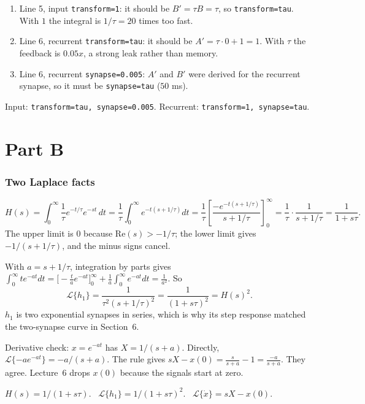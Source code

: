 \documentclass[11pt,letterpaper]{article}
\newcommand{\ans}[1]{\par\vspace{4pt}{\bfseries #1}\quad}
\begin{document}
\ans{Q2}
\begin{enumerate}[label=(\arabic*)]
\item Line 5, input \texttt{transform=1}: it should be $B' = \tau B = \tau$, so \texttt{transform=tau}. With $1$ the integral is $1/\tau = 20$ times too fast.
\item Line 6, recurrent \texttt{transform=tau}: it should be $A' = \tau\cdot 0 + 1 = 1$. With $\tau$ the feedback is $0.05x$, a strong leak rather than memory.
\item Line 6, recurrent \texttt{synapse=0.005}: $A'$ and $B'$ were derived for the recurrent synapse, so it must be \texttt{synapse=tau} ($50$ ms).
\end{enumerate}
\begin{result}
Input: \texttt{transform=tau, synapse=0.005}. Recurrent: \texttt{transform=1, synapse=tau}.
\end{result}

\part*{Part B}

\section{Two Laplace facts}

\ans{Q1}
\[
H(s) = \int_0^\infty \frac1\tau e^{-t/\tau}e^{-st}\,dt = \frac1\tau\int_0^\infty e^{-t(s + 1/\tau)}dt
= \frac1\tau\left[\frac{-e^{-t(s + 1/\tau)}}{s + 1/\tau}\right]_0^\infty = \frac1\tau\cdot\frac{1}{s + 1/\tau} = \frac{1}{1 + s\tau}.
\]
The upper limit is $0$ because $\mathrm{Re}(s) > -1/\tau$; the lower limit gives $-1/(s + 1/\tau)$, and the minus signs cancel.

\ans{Q2}
With $a = s + 1/\tau$, integration by parts gives $\int_0^\infty t e^{-at}dt = \bigl[-\tfrac{t}{a}e^{-at}\bigr]_0^\infty + \tfrac1a\int_0^\infty e^{-at}dt = \tfrac{1}{a^2}$. So
\[
\mathcal{L}\{h_1\} = \frac{1}{\tau^2(s + 1/\tau)^2} = \frac{1}{(1 + s\tau)^2} = H(s)^2.
\]
$h_1$ is two exponential synapses in series, which is why its step response matched the two-synapse curve in Section~6.

Derivative check: $x = e^{-at}$ has $X = 1/(s + a)$. Directly, $\mathcal{L}\{-ae^{-at}\} = -a/(s + a)$. The rule gives $sX - x(0) = \frac{s}{s + a} - 1 = \frac{-a}{s + a}$. They agree. Lecture~6 drops $x(0)$ because the signals start at zero.
\begin{result}
$H(s) = 1/(1 + s\tau)$. \ $\mathcal{L}\{h_1\} = 1/(1 + s\tau)^2$. \ $\mathcal{L}\{\dot x\} = sX - x(0)$.
\end{result}
\end{document}
